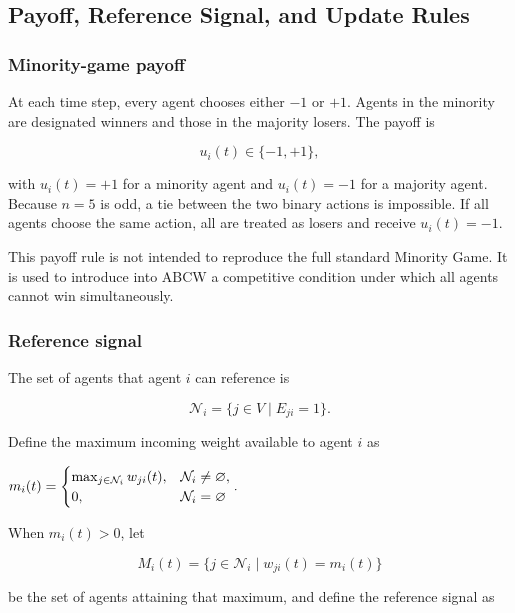 \documentclass[
  11pt,
]{article}
\begin{document}
\hypertarget{payoff-reference-signal-and-update-rules}{%
\subsection{Payoff, Reference Signal, and Update
Rules}\label{payoff-reference-signal-and-update-rules}}

\hypertarget{minority-game-payoff}{%
\subsubsection{Minority-game payoff}\label{minority-game-payoff}}

At each time step, every agent chooses either \({-1}\) or \({+1}\).
Agents in the minority are designated winners and those in the majority
losers. The payoff is

\[{u_i(t)\in\lbrace-1,+1\rbrace,}\]

with \({u_i(t)=+1}\) for a minority agent and \({u_i(t)=-1}\) for a
majority agent. Because \({n=5}\) is odd, a tie between the two binary
actions is impossible. If all agents choose the same action, all are
treated as losers and receive \({u_i(t)=-1}\).

This payoff rule is not intended to reproduce the full standard Minority
Game. It is used to introduce into ABCW a competitive condition under
which all agents cannot win simultaneously.

\hypertarget{reference-signal}{%
\subsubsection{Reference signal}\label{reference-signal}}

The set of agents that agent \({i}\) can reference is

\[{\mathcal N_i=\lbrace j\in V\mid E_{ji}=1\rbrace.}\]

Define the maximum incoming weight available to agent \({i}\) as

\({m_i(t)= \begin{cases} \max_{j\in\mathcal N_i}w_{ji}(t),&\mathcal N_i\neq\varnothing,\cr 0,&\mathcal N_i=\varnothing \end{cases}.}\)

When \({m_i(t)>0}\), let

\[{M_i(t)=\lbrace j\in\mathcal N_i\mid w_{ji}(t)=m_i(t)\rbrace}\]

be the set of agents attaining that maximum, and define the reference
signal as
\end{document}
